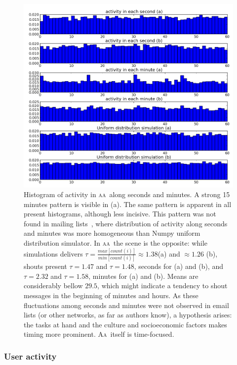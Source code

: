 \documentclass[a4paper, 11pt]{article} %
\newcommand{\aab}{\textsc{aa}}
\newcommand{\aai}{\textsc{Aa}}
\begin{document}


\begin{figure}[H]
    \hspace{-25mm}
    \includegraphics[width=1.3\textwidth]{imgs/segMinHist}
    \caption{\small Histogram of activity in \aab\ along seconds and minutes. A strong 15 minutes pattern is visible in (a). The same pattern is apparent in all present histograms, although less incisive. This pattern was not found in mailing lists~\cite{stabNet}, where distribution of activity along seconds and minutes was more homogeneous than Numpy uniform distribution simulator. In \aab\ the scene is the opposite: while simulations delivers $\tau=\frac{max[count(i)]}{min[count(i)]}\approx1.38$(a) and $\approx 1.26$ (b), shouts present $\tau=1.47$ and $\tau=1.48$, seconds for (a) and (b), and$\tau=2.32$ and $\tau=1.58$, minutes for (a) and (b). Means are considerably bellow $29.5$, which might indicate a tendency to shout messages in the beginning of minutes and hours. As these fluctuations among seconds and minutes were not observed in email lists (or other networks, as far as authors know), a hypothesis arises: the tasks at hand and the culture and socioeconomic factors makes timing more prominent. \aai\ itself is time-focused.}\label{fig:histSecMin}
\end{figure}



\subsubsection{User activity}
\end{document}
